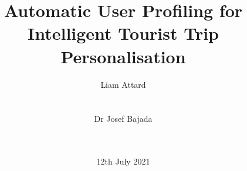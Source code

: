 \documentclass{sig-alternate}
\begin{document}
\title{Automatic User Proﬁling for Intelligent
Tourist Trip Personalisation}
\author{
\alignauthor
Liam Attard\\
       \\
       \\
\alignauthor
Dr Josef Bajada\\
       \\
       \\
}

\date{12th July 2021}

\makeatletter
\def\@copyrightspace{\relax}
\makeatother
\end{document}
